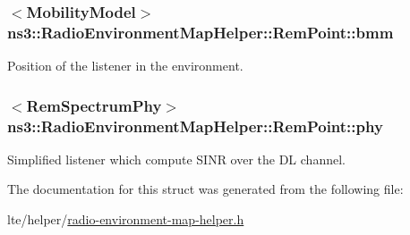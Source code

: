 \subsubsection[{\texorpdfstring{bmm}{bmm}}]{$<${\bf Mobility\+Model}$>$ ns3\+::\+Radio\+Environment\+Map\+Helper\+::\+Rem\+Point\+::bmm}\hypertarget{structns3_1_1RadioEnvironmentMapHelper_1_1RemPoint_ab5ec56ca2ff5f1641dfcbe12028668c9}{}\label{structns3_1_1RadioEnvironmentMapHelper_1_1RemPoint_ab5ec56ca2ff5f1641dfcbe12028668c9}


Position of the listener in the environment. 

\subsubsection[{\texorpdfstring{phy}{phy}}]{$<${\bf Rem\+Spectrum\+Phy}$>$ ns3\+::\+Radio\+Environment\+Map\+Helper\+::\+Rem\+Point\+::phy}\hypertarget{structns3_1_1RadioEnvironmentMapHelper_1_1RemPoint_a2408da1d47adc2dd4831ff94fd08b002}{}\label{structns3_1_1RadioEnvironmentMapHelper_1_1RemPoint_a2408da1d47adc2dd4831ff94fd08b002}


Simplified listener which compute S\+I\+NR over the DL channel. 



The documentation for this struct was generated from the following file\+:\begin{DoxyCompactItemize}
\item 
lte/helper/\hyperlink{radio-environment-map-helper_8h}{radio-\/environment-\/map-\/helper.\+h}\end{DoxyCompactItemize}

